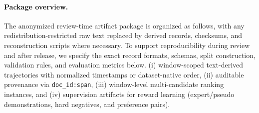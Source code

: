 \documentclass{article}
\begin{document}
\paragraph{Package overview.}
The anonymized review-time artifact package is organized as follows, with any redistribution-restricted raw text replaced by derived records, checksums, and reconstruction scripts where necessary.
To support reproducibility during review and after release, we specify the exact record formats, schemas, split construction, validation rules, and evaluation metrics below.
(i) window-scoped text-derived trajectories with normalized timestamps or dataset-native order,
(ii) auditable provenance via \texttt{doc\_id:span},
(iii) window-level multi-candidate ranking instances, and
(iv) supervision artifacts for reward learning (expert/pseudo demonstrations, hard negatives, and preference pairs).
\end{document}
